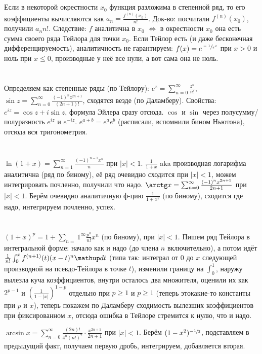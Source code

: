 \section{} %
Если в некоторой окрестности $x_0$ функция разложима в степенной ряд, то его коэффициенты вычисляются как $a_n=\frac{f^{(n)}(x_0)}{n!}$.
Док-во: посчитали $f^{(n)}(x_0)$, получили $a_nn!$.
Следствие: $f$ аналитична в $x_0$ $\iff$ в окрестности $x_0$ она есть сумма своего ряда Тейлора для точки $x_0$.
Если Тейлор есть (и даже бесконечная дифференцируемость), аналитичность не гарантируем: $f(x)=e^{\sfrac{-1}{x^2}}$ при $x>0$ и ноль при $x \le 0$, производные у неё все нули, а вот сама она не ноль.

\section{} %
Определяем как степенные ряды (по Тейлору): $e^z = \sum_{n=0}^\infty \frac{z^n}{n!}$,
$\sin z = \sum_{n=0}^\infty \frac{(-1)^nz^{2n+1}}{(2n+1)!}$, сходятся везде (по Даламберу).
Свойства: $e^{iz}=\cos z + i \sin z$, формула Эйлера сразу отсюда.
$\cos$ и $\sin$ через полусумму/полуразность $e^{iz}$ и $e^{-iz}$.
$e^{a+b}=e^ae^b$ (расписали, вспомнили бином Ньютона), отсюда вся тригонометрия.

\section{} %
$\ln(1+x)=\sum_{n=1}^\infty \frac{(-1)^{n-1}x^n}{n}$ при $|x|<1$.
$\frac{1}{1+x}$ aka производная логарифма аналитична (ряд по биному),
её ряд очевидно сходится при $|x|<1$, можем интегрировать почленно, получили что надо.
$\arctg x = \sum_{n=0}^\infty \frac{(-1)^nx^{2n+1}}{2n+1}$ при $|x|<1$.
Берём очевидно аналитичную ф-цию $\frac{1}{1+x^2}$ (по биному), сходится где надо,
интегрируем почленно, успех.

\section{} %
$(1+x)^p = 1 + \sum_{n=}1^\infty \frac{p^{\underline k}}{n!}x^n$ (по биному), при $|x|<1$.
Пишем ряд Тейлора в интегральной форме: начало как и надо (до члена $n$ включительно), а потом идёт $\frac{1}{n!}\int_0^x f^{(n+1)}(t)(x - t)^n\d t$
(типа так: интеграл от 0 до $x$ следующей производной на псевдо-Тейлора в точке $t$), изменили границу на $\int_0^1$, наружу вылезла куча коэффициентов,
внутри осталось два множителя, оценили их как $2^{p-1}$ и $\left(\frac{1}{1-|x|}\right)^{1-p}$ отдельно при $p \ge 1$ и $p \ge 1$ (теперь этокакие-то константы при $p$ и $x$),
теперь покажем по Даламберу сходимость вылезших коэффициентов при фиксированном $x$, отсюда ошибка в Тейлоре стремится к нулю, что и надо.

$\arcsin x = \sum_{n=0}^\infty \frac{(2n)!}{4^n(n!)^2} \cdot \frac{x^{2n+1}}{2n+1}$ при $|x|<1$.
Берём $(1-x^2)^{-\sfrac 1 2}$, подставляем в предыдущий факт, получаем первую дробь, интегрируем, добавляется вторая.
